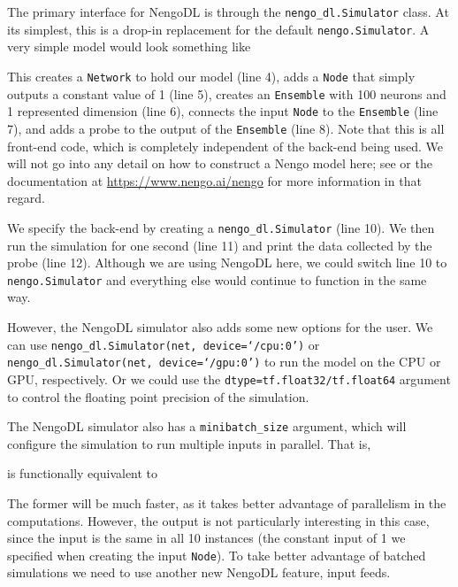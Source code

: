 \documentclass{article}
\begin{document}
The primary interface for NengoDL is through the \texttt{nengo\_dl.Simulator} class.  At its simplest, this is a drop-in replacement for the default \texttt{nengo.Simulator}.  A very simple model would look something like

\lstset{language=Python, numbers=left, columns=fixed, basicstyle=\ttfamily}


This creates a \texttt{Network} to hold our model (line 4), adds a \texttt{Node} that simply outputs a constant value of 1 (line 5), creates an \texttt{Ensemble} with 100 neurons and 1 represented dimension (line 6), connects the input \texttt{Node} to the \texttt{Ensemble} (line 7), and adds a probe to the output of the \texttt{Ensemble} (line 8).  Note that this is all front-end code, which is completely independent of the back-end being used.  We will not go into any detail on how to construct a Nengo model here; see \citet{Bekolay2014} or the documentation at \url{https://www.nengo.ai/nengo} for more information in that regard.

We specify the back-end by creating a \texttt{nengo\_dl.Simulator} (line 10).  We then run the simulation for one second (line 11) and print the data collected by the probe (line 12).  Although we are using NengoDL here, we could switch line 10 to \texttt{nengo.Simulator} and everything else would continue to function in the same way.

However, the NengoDL simulator also adds some new options for the user.  We can use \texttt{nengo\_dl.Simulator(net, device=`/cpu:0')} or \texttt{nengo\_dl.Simulator(net, device=`/gpu:0')} to run the model on the CPU or GPU, respectively.  Or we could use the \texttt{dtype=tf.float32/tf.float64} argument to control the floating point precision of the simulation.

The NengoDL simulator also has a \texttt{minibatch\_size} argument, which will configure the simulation to run multiple inputs in parallel.  That is,

\lstset{numbers=none}


is functionally equivalent to



The former will be much faster, as it takes better advantage of parallelism in the computations.  However, the output is not particularly interesting in this case, since the input is the same in all 10 instances (the constant input of 1 we specified when creating the input \texttt{Node}).  To take better advantage of batched simulations we need to use another new NengoDL feature, input feeds.
\end{document}
